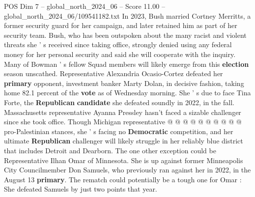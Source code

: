 \begin{textsample}{POS Dim 7 – global\_north\_2024\_06 – Score 11.00 – global\_north\_2024\_06/109541182.txt}
In 2023, Bush married Cortney Merritts, a former security guard for her campaign, and later retained him as part of her security team.
Bush, who has been outspoken about the many racist and violent threats she ' s received since taking office, strongly denied using any federal money for her personal security and said she will cooperate with the inquiry.
Many of Bowman ' s fellow Squad members will likely emerge from this \textbf{election} season unscathed.
Representative Alexandria Ocasio-Cortez defeated her \textbf{primary} opponent, investment banker Marty Dolan, in decisive fashion, taking home 82.1 percent of the \textbf{vote} as of Wednesday morning.
She ' s due to face Tina Forte, the \textbf{Republican} \textbf{candidate} she defeated soundly in 2022, in the fall.
Massachusetts representative Ayanna Pressley hasn't faced a sizable challenger since she took office.
Though Michigan representative @ @ @ @ @ @ @ @ @ @ pro-Palestinian stances, she ' s facing no \textbf{Democratic} competition, and her ultimate \textbf{Republican} challenger will likely struggle in her reliably blue district that includes Detroit and Dearborn.
The one other exception could be Representative Ilhan Omar of Minnesota.
She is up against former Minneapolis City Councilmember Don Samuels, who previously ran against her in 2022, in the August 13 \textbf{primary}.
The rematch could potentially be a tough one for Omar : She defeated Samuels by just two points that year.

\end{textsample}
